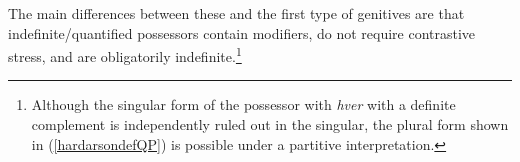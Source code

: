 \documentclass[output=paper]{langscibook}
\begin{document}
The main differences between these and the first type of genitives are that indefinite/quantified possessors contain modifiers, do not require contrastive stress, and are obligatorily indefinite.\footnote{Although the singular form of the possessor with \textit{hver} with a definite complement is independently ruled out in the singular, the plural form shown in (\ref{hardarsondefQP}) is possible under a partitive interpretation.}


\begin{exe}
	\ex	\label{hardarsonbadQ}
		\begin{xlist}
		\setlength{\columnsep}{10pt}
		\begin{multicols}{2}
			\label{hardarsondefQP}
		\end{multicols}
		\end{xlist}
\end{exe}


\begin{comment}
\begin{exe}
	\ex	
		\begin{xlist}
		\begin{multicols}{2}
			\ex[]{	\gll	ráð [heimsk-ra mann-a]\\
							advice foolish-{\hardGen} men-{\hardGen}\\
					\glt	`advice of fools'
					}
			\ex[]{	\gll	hús [hver-s manns-s]\\
							house each-{\hardGen} man-{\hardGen}\\
					\glt	`each man's house'
					}
		\end{multicols}
		\end{xlist}
	\ex	
		\begin{xlist}
		\begin{multicols}{2}
			\ex[]{	\gll	saga [hálf-rar ald-ar]\\
							history half-{\hardGen} century-{\hardGen}\\
					\glt	`events of a particular 50 year span'
					}
			\ex[*?]{	\gll	tálbeita [tvenn-s kon-ar]\\
							lure two-{\hardGen} kind-{\hardGen}\\
					\glt	`two kinds of lures' 
					}
		\end{multicols}
		\end{xlist}
\end{exe}
\end{comment}
\end{document}
